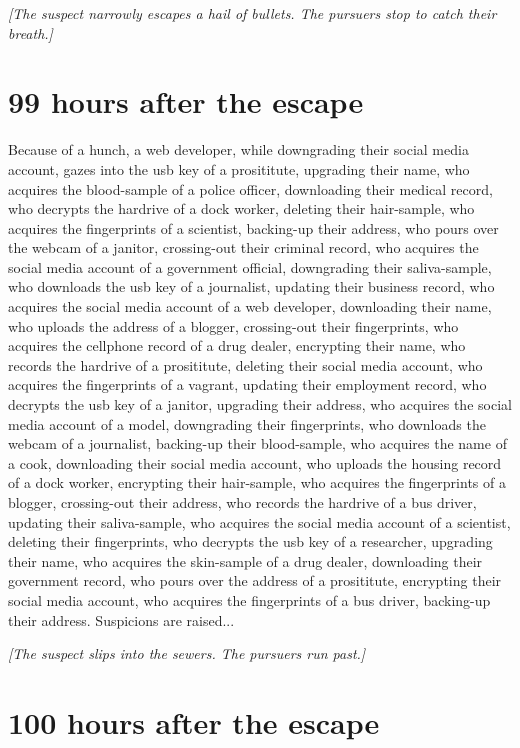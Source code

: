\documentclass{report}
\begin{document}
\textit{[The suspect narrowly escapes a hail of bullets. The pursuers stop to catch their breath.]}


\section*{99 \small{hours after the escape}}

Because of a hunch, a web developer, while downgrading their social media account, gazes into the usb key of a prosititute, upgrading their name, who acquires the blood-sample of a police officer, downloading their medical record, who decrypts the hardrive of a dock worker, deleting their hair-sample, who acquires the fingerprints of a scientist, backing-up their address, who pours over the webcam of a janitor, crossing-out their criminal record, who acquires the social media account of a government official, downgrading their saliva-sample, who downloads the usb key of a journalist, updating their business record, who acquires the social media account of a web developer, downloading their name, who uploads the address of a blogger, crossing-out their fingerprints, who acquires the cellphone record of a drug dealer, encrypting their name, who records the hardrive of a prosititute, deleting their social media account, who acquires the fingerprints of a vagrant, updating their employment record, who decrypts the usb key of a janitor, upgrading their address, who acquires the social media account of a model, downgrading their fingerprints, who downloads the webcam of a journalist, backing-up their blood-sample, who acquires the name of a cook, downloading their social media account, who uploads the housing record of a dock worker, encrypting their hair-sample, who acquires the fingerprints of a blogger, crossing-out their address, who records the hardrive of a bus driver, updating their saliva-sample, who acquires the social media account of a scientist, deleting their fingerprints, who decrypts the usb key of a researcher, upgrading their name, who acquires the skin-sample of a drug dealer, downloading their government record, who pours over the address of a prosititute, encrypting their social media account, who acquires the fingerprints of a bus driver, backing-up their address. Suspicions are raised...

\textit{[The suspect slips into the sewers. The pursuers run past.]}


\section*{100 \small{hours after the escape}}
\end{document}
